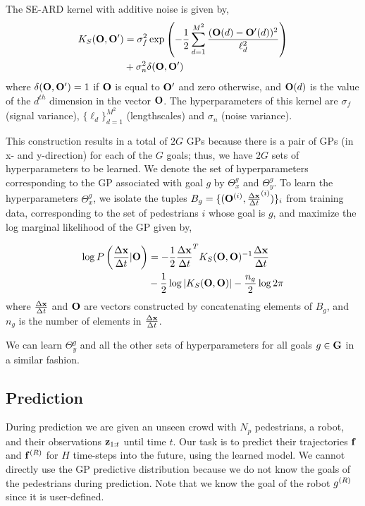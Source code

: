 The SE-ARD kernel with additive noise is given by,
\begin{align}
  \label{eqn:oigp-kernel}
  \begin{split}
    K_{S}(\mathbf{O}, \mathbf{O}') &= \sigma_f^2 \exp\left(-\frac{1}{2}\sum_{d=1}^{M^2} \frac{(\mathbf{O}(d) - \mathbf{O}'(d))^2}{\ell_d^2}\right) \\
    &+ \sigma_n^2 \delta(\mathbf{O}, \mathbf{O}')
  \end{split}
\end{align}
where $\delta(\mathbf{O},\mathbf{O}') = 1$ if $\mathbf{O}$ is equal to $\mathbf{O}'$
and zero otherwise, and $\mathbf{O}(d)$ is the value of the $d^{th}$
dimension in the vector $\mathbf{O}$. The hyperparameters of this kernel
are $\sigma_f$ (signal variance), $\{\ell_d\}_{d=1}^{M^{2}}$
(lengthscales) and $\sigma_n$ (noise variance).


This construction results in a total of $2G$ GPs because there is a
pair of GPs (in x- and y-direction) for each of the $G$ goals; thus,
we have $2G$ sets of hyperparameters to be learned. We denote the set
of hyperparameters corresponding to the GP associated with goal $g$ by
$\Theta_x^g$ and $\Theta_y^g$. To learn the hyperparameters
$\Theta_x^g$, we isolate the tuples
$B_g = \{(\mathbf{O}^{(i)}, \frac{\Delta \mathbf{x}}{\Delta t}^{(i)})\}_i$ from training data,
corresponding to the set of pedestrians $i$ whose goal is $g$, and
maximize the log marginal likelihood of the GP \cite{rasmussen06}
given by,
%
%

\begin{align}
  \label{eqn:oigp-logmarginal}
  \begin{split}
    \log P\left(\frac{\Delta \mathbf{x}}{\Delta t}|\mathbf{O}\right) &= -\frac{1}{2}\frac{\Delta \mathbf{x}}{\Delta t}^TK_S(\mathbf{O}, \mathbf{O})^{-1}\frac{\Delta \mathbf{x}}{\Delta t} \\
    &- \frac{1}{2}\log|K_S(\mathbf{O}, \mathbf{O})| - \frac{n_g}{2}\log 2\pi
  \end{split}
\end{align}
where $\frac{\Delta \mathbf{x}}{\Delta t}$ and $\mathbf{O}$ are vectors constructed by concatenating
elements of $B_g$, and $n_g$ is the number of elements in $\frac{\Delta \mathbf{x}}{\Delta t}$.

We can learn $\Theta_y^g$ and all the other sets of hyperparameters
for all goals $g \in \mathbf{G}$ in a similar fashion.
%
%
%
%
%

\subsection{Prediction}
\label{sec:oigp-prediction}

During prediction we are given an unseen crowd with $N_p$ pedestrians,
a robot, and their observations $\mathbf{z}_{1:t}$ until time $t$. Our
task is to predict their trajectories $\mathbf{f}$ and $\mathbf{f}^{(R)}$ for
$H$ time-steps into the future, using the learned model. We cannot
directly use the GP predictive distribution because we do not know the
goals of the pedestrians during prediction. Note that we know the goal
of the robot $g^{(R)}$ since it is user-defined.

